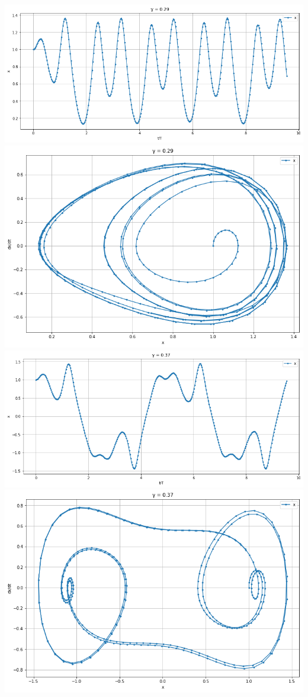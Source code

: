 \documentclass{article}
\begin{document}
\begin{center}
    \includegraphics[scale = 0.3]{291.png}
    \includegraphics[scale = 0.23]{292.png}
    \includegraphics[scale = 0.3]{371.png}
    \includegraphics[scale = 0.23]{372.png}

\end{center}
\end{document}
